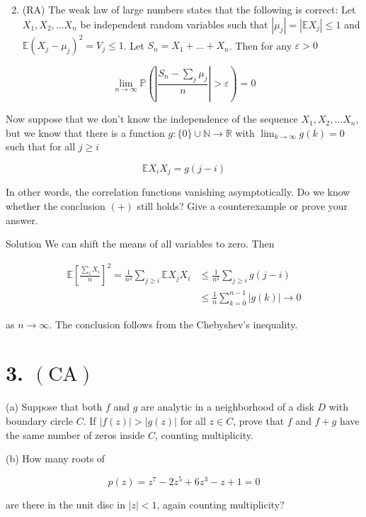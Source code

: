 \documentclass[10pt]{article}
\begin{document}
\begin{enumerate}
  \setcounter{enumi}{1}
  \item (RA) The weak law of large numbers states that the following is correct: Let $X_{1}, X_{2}, \ldots X_{n}$ be independent random variables such that $\left|\mu_{j}\right|=\left|\mathbb{E} X_{j}\right| \leq 1$ and $\mathbb{E}\left(X_{j}-\mu_{j}\right)^{2}=V_{j} \leq 1$. Let $S_{n}=X_{1}+\ldots+X_{n}$. Then for any $\varepsilon>0$
\end{enumerate}

$$
\lim _{n \rightarrow \infty} \mathbb{P}\left(\left|\frac{S_{n}-\sum_{j} \mu_{j}}{n}\right|>\varepsilon\right)=0
$$

Now suppose that we don't know the independence of the sequence $X_{1}, X_{2}, \ldots X_{n}$, but we know that there is a function $g:\{0\} \cup \mathbb{N} \rightarrow \mathbb{R}$ with $\lim _{k \rightarrow \infty} g(k)=0$ such that for all $j \geq i$

$$
\mathbb{E} X_{i} X_{j}=g(j-i)
$$

In other words, the correlation functions vanishing asymptotically. Do we know whether the conclusion $(+)$ still holds? Give a counterexample or prove your answer.

Solution We can shift the means of all variables to zero. Then

$$
\begin{aligned}
\mathbb{E}\left[\frac{\sum_{i} X_{i}}{n}\right]^{2}=\frac{1}{n^{2}} \sum_{j \geq i} \mathbb{E} X_{j} X_{i} & \leq \frac{1}{n^{2}} \sum_{j \geq i} g(j-i) \\
& \leq \frac{1}{n} \sum_{k=0}^{n-1}|g(k)| \rightarrow 0
\end{aligned}
$$

as $n \rightarrow \infty$. The conclusion follows from the Chebyshev's inequality.

\section{3. $(\mathrm{CA})$}
(a) Suppose that both $f$ and $g$ are analytic in a neighborhood of a disk $D$ with boundary circle $C$. If $|f(z)|>|g(z)|$ for all $z \in C$, prove that $f$ and $f+g$ have the same number of zeros inside $C$, counting multiplicity.

(b) How many roots of

$$
p(z)=z^{7}-2 z^{5}+6 z^{3}-z+1=0
$$

are there in the unit disc in $|z|<1$, again counting multiplicity?
\end{document}
